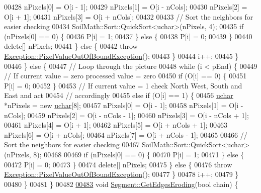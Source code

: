 \begin{DoxyCode}
00428         nPixels[0] = O[i - 1];
00429         nPixels[1] = O[i - nCols];
00430         nPixels[2] = O[i + 1];
00431         nPixels[3] = O[i + nCols];
00432 
00433         \textcolor{comment}{// Sort the neighbors for easier checking}
00434         SoilMath::Sort::QuickSort<uchar>(nPixels, 4);
00435         \textcolor{keywordflow}{if} (nPixels[0] == 0) \{
00436           P[i] = 1;
00437         \} \textcolor{keywordflow}{else} \{
00438           P[i] = 0;
00439         \}
00440         \textcolor{keyword}{delete}[] nPixels;
00441       \} \textcolor{keywordflow}{else} \{
00442         \textcolor{keywordflow}{throw} \hyperlink{class_vision_1_1_exception_1_1_pixel_value_out_of_bound_exception}{Exception::PixelValueOutOfBoundException}();
00443       \}
00444       i++;
00445     \}
00446   \} \textcolor{keywordflow}{else} \{
00447     \textcolor{comment}{// Loop through the picture}
00448     \textcolor{keywordflow}{while} (i < pEnd) \{
00449       \textcolor{comment}{// If current value = zero processed value = zero}
00450       \textcolor{keywordflow}{if} (O[i] == 0) \{
00451         P[i] = 0;
00452       \}
00453       \textcolor{comment}{// If current value = 1 check North West, South and East and act}
00454       \textcolor{comment}{// accordingly}
00455       \textcolor{keywordflow}{else} \textcolor{keywordflow}{if} (O[i] == 1) \{
00456         \hyperlink{_soil_math_types_8h_a65f85814a8290f9797005d3b28e7e5fc}{uchar} *nPixels = \textcolor{keyword}{new} \hyperlink{_soil_math_types_8h_a65f85814a8290f9797005d3b28e7e5fc}{uchar}[8];
00457         nPixels[0] = O[i - 1];
00458         nPixels[1] = O[i - nCols];
00459         nPixels[2] = O[i - nCols - 1];
00460         nPixels[3] = O[i - nCols + 1];
00461         nPixels[4] = O[i + 1];
00462         nPixels[5] = O[i + nCols + 1];
00463         nPixels[6] = O[i + nCols];
00464         nPixels[7] = O[i + nCols - 1];
00465 
00466         \textcolor{comment}{// Sort the neighbors for easier checking}
00467         SoilMath::Sort::QuickSort<uchar>(nPixels, 8);
00468 
00469         \textcolor{keywordflow}{if} (nPixels[0] == 0) \{
00470           P[i] = 1;
00471         \} \textcolor{keywordflow}{else} \{
00472           P[i] = 0;
00473         \}
00474         \textcolor{keyword}{delete}[] nPixels;
00475       \} \textcolor{keywordflow}{else} \{
00476         \textcolor{keywordflow}{throw} \hyperlink{class_vision_1_1_exception_1_1_pixel_value_out_of_bound_exception}{Exception::PixelValueOutOfBoundException}();
00477       \}
00478       i++;
00479     \}
00480   \}
00481 \}
00482 
\hypertarget{_segment_8cpp_source_l00483}{}\hyperlink{class_vision_1_1_segment_af4fe7471c44ded04653f8e3f74162c86}{00483} \textcolor{keywordtype}{void} \hyperlink{class_vision_1_1_segment_af4fe7471c44ded04653f8e3f74162c86}{Segment::GetEdgesEroding}(\textcolor{keywordtype}{bool} chain) \{

\end{DoxyCode}
